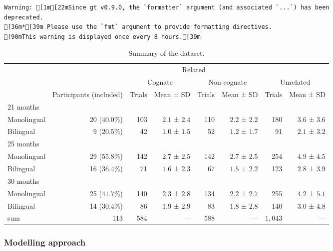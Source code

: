 \documentclass[
  letterpaper,
  DIV=11,
  numbers=noendperiod]{scrartcl}
\begin{document}
\begin{verbatim}
Warning: [1m[22mSince gt v0.9.0, the `formatter` argument (and associated `...`) has been
deprecated.
[36m*[39m Please use the `fmt` argument to provide formatting directives.
[90mThis warning is displayed once every 8 hours.[39m
\end{verbatim}

\hypertarget{tbl-attrition-group}{}
\begin{longtable}{l|rrrrrrr}
\caption{\label{tbl-attrition-group}Summary of the dataset. }\tabularnewline

\toprule
\multicolumn{1}{l}{} &  & \multicolumn{4}{c}{Related} &  &  \\ 
\cmidrule(lr){3-6}
\multicolumn{1}{l}{} &  & \multicolumn{2}{c}{Cognate} & \multicolumn{2}{c}{Non-cognate} & \multicolumn{2}{c}{Unrelated} \\ 
\cmidrule(lr){3-4} \cmidrule(lr){5-6} \cmidrule(lr){7-8}
\multicolumn{1}{l}{} & Participants (included) & Trials & Mean ± SD & Trials & Mean ± SD & Trials & Mean ± SD \\ 
\midrule
\multicolumn{8}{l}{21 months} \\ 
\midrule
Monolingual & 20 ($40.0\%$) & 103 & $2.1$ ± $2.4$ & 110 & $2.2$ ± $2.2$ & 180 & $3.6$ ± $3.6$ \\ 
Bilingual & 9 ($20.5\%$) & 42 & $1.0$ ± $1.5$ & 52 & $1.2$ ± $1.7$ & 91 & $2.1$ ± $3.2$ \\ 
\midrule
\multicolumn{8}{l}{25 months} \\ 
\midrule
Monolingual & 29 ($55.8\%$) & 142 & $2.7$ ± $2.5$ & 142 & $2.7$ ± $2.5$ & 254 & $4.9$ ± $4.5$ \\ 
Bilingual & 16 ($36.4\%$) & 71 & $1.6$ ± $2.3$ & 67 & $1.5$ ± $2.2$ & 123 & $2.8$ ± $3.9$ \\ 
\midrule
\multicolumn{8}{l}{30 months} \\ 
\midrule
Monolingual & 25 ($41.7\%$) & 140 & $2.3$ ± $2.8$ & 134 & $2.2$ ± $2.7$ & 255 & $4.2$ ± $5.1$ \\ 
Bilingual & 14 ($30.4\%$) & 86 & $1.9$ ± $2.9$ & 83 & $1.8$ ± $2.8$ & 140 & $3.0$ ± $4.8$ \\ 
\midrule 
\midrule 
sum & $113$ & $584$ & — & $588$ & — & $1,043$ & — \\ 
\bottomrule
\end{longtable}

\hypertarget{modelling-approach}{%
\subsubsection{Modelling approach}\label{modelling-approach}}
\end{document}
